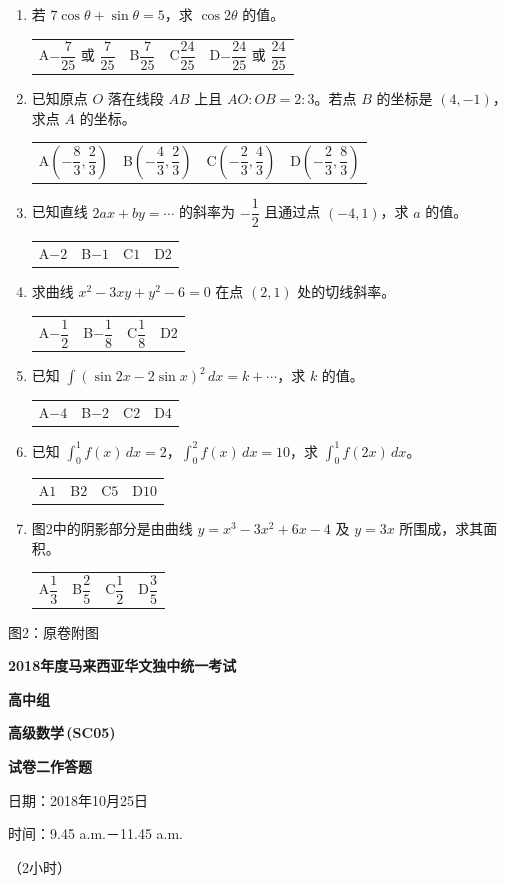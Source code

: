\documentclass[12pt,a4paper]{exam-zh}
\makeatletter
\newcommand{\optline}[4]{%
  \begin{tabular*}{\linewidth}{@{\extracolsep{\fill}}llll}
  A\;#1 & B\;#2 & C\;#3 & D\;#4
  \end{tabular*}}
\newcommand{\papertitleone}{2018年度马来西亚华文独中统一考试}
\newcommand{\papersubject}{高级数学\,(SC05)}
\makeatother
\begin{document}
\begin{enumerate}[leftmargin=2.2em,label=\arabic*.,start=14]
\item 若 $7\cos\theta+\sin\theta=5$，求 $\cos 2\theta$ 的值。\\
\optline{$-\dfrac7{25}$ 或 $\dfrac7{25}$}{$\dfrac7{25}$}{$\dfrac{24}{25}$}{$-\dfrac{24}{25}$ 或 $\dfrac{24}{25}$}

\item 已知原点 $O$ 落在线段 $AB$ 上且 $AO:OB=2:3$。若点 $B$ 的坐标是 $(4,-1)$，求点 $A$ 的坐标。\\
\optline{$\left(-\dfrac83,\dfrac23\right)$}{$\left(-\dfrac43,\dfrac23\right)$}{$\left(-\dfrac23,\dfrac43\right)$}{$\left(-\dfrac23,\dfrac83\right)$}

\item 已知直线 $2ax+by=\cdots$ 的斜率为 $-\dfrac12$ 且通过点 $(-4,1)$，求 $a$ 的值。\\
\optline{$-2$}{$-1$}{$1$}{$2$}

\item 求曲线 $x^2-3xy+y^2-6=0$ 在点 $(2,1)$ 处的切线斜率。\\
\optline{$-\dfrac12$}{$-\dfrac18$}{$\dfrac18$}{$2$}

\item 已知 $\displaystyle \int (\sin 2x-2\sin x)^2\,dx = k+\cdots$，求 $k$ 的值。\\
\optline{$-4$}{$-2$}{$2$}{$4$}

\item 已知 $\displaystyle \int_0^1 f(x)\,dx=2$，$\displaystyle \int_0^2 f(x)\,dx=10$，求 $\displaystyle \int_0^1 f(2x)\,dx$。\\
\optline{$1$}{$2$}{$5$}{$10$}

\item 图2中的阴影部分是由曲线 $y=x^3-3x^2+6x-4$ 及 $y=3x$ 所围成，求其面积。\\
\optline{$\dfrac13$}{$\dfrac25$}{$\dfrac12$}{$\dfrac35$}
\end{enumerate}

\vfill
\begin{flushright}图2：原卷附图\end{flushright}

\newpage

\begin{center}
  {\bfseries \papertitleone\par}
  \vspace{1.2em}
  {\bfseries 高中组\par}
  \vspace{1.1em}
  {\bfseries \papersubject\par}
  \vspace{1.2em}
  {\bfseries 试卷二\quad 作答题\par}
  \vspace{0.8em}
  日期：2018年10月25日\par
  时间：9.45 a.m.－11.45 a.m.\par
  （2小时）
\end{center}
\end{document}
